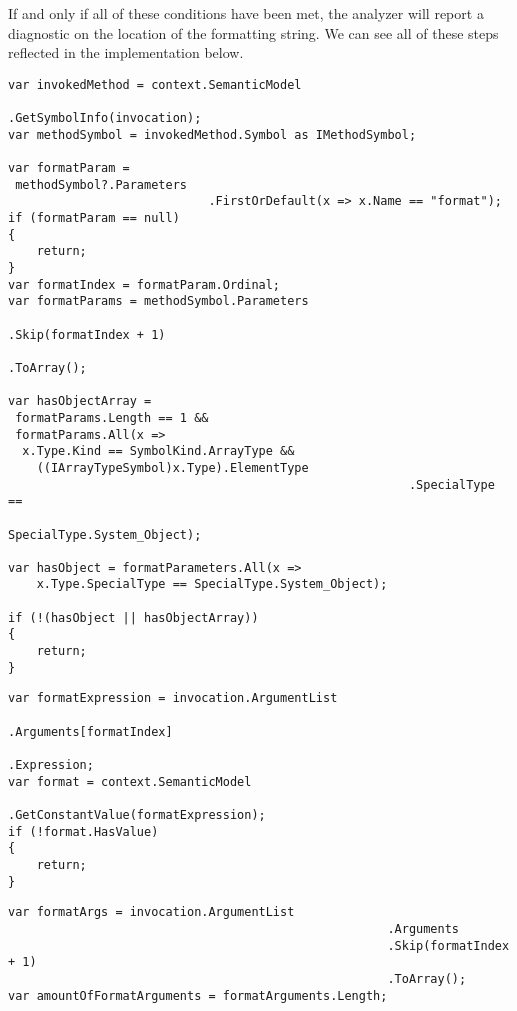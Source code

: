 \noindent If and only if all of these conditions have been met, the analyzer will report a diagnostic on the location of the formatting string. We can see all of these steps reflected in the implementation below.


\begin{lstlisting}[label={lst:diagnostic-verifying-parameters}]
var invokedMethod = context.SemanticModel
												   .GetSymbolInfo(invocation);
var methodSymbol = invokedMethod.Symbol as IMethodSymbol;

var formatParam = 
 methodSymbol?.Parameters
							.FirstOrDefault(x => x.Name == "format");
if (formatParam == null)
{
	return;
}
var formatIndex = formatParam.Ordinal;
var formatParams = methodSymbol.Parameters
															 .Skip(formatIndex + 1)
															 .ToArray();
																	
var hasObjectArray = 
 formatParams.Length == 1 &&
 formatParams.All(x => 
  x.Type.Kind == SymbolKind.ArrayType && 
	((IArrayTypeSymbol)x.Type).ElementType
														.SpecialType == 
														 SpecialType.System_Object);
																							
var hasObject = formatParameters.All(x => 
	x.Type.SpecialType == SpecialType.System_Object);

if (!(hasObject || hasObjectArray))
{
	return;
}
\end{lstlisting}

\begin{lstlisting}[label={lst:diagnostic-compile-time-constant}]
var formatExpression = invocation.ArgumentList
																 .Arguments[formatIndex]
																 .Expression;
var format = context.SemanticModel
										.GetConstantValue(formatExpression);
if (!format.HasValue)
{
	return;
}
\end{lstlisting}

\begin{lstlisting}[label={lst:diagnostic-extracting-arguments}]
var formatArgs = invocation.ArgumentList
													 .Arguments
													 .Skip(formatIndex + 1)
													 .ToArray();
var amountOfFormatArguments = formatArguments.Length;
\end{lstlisting}

